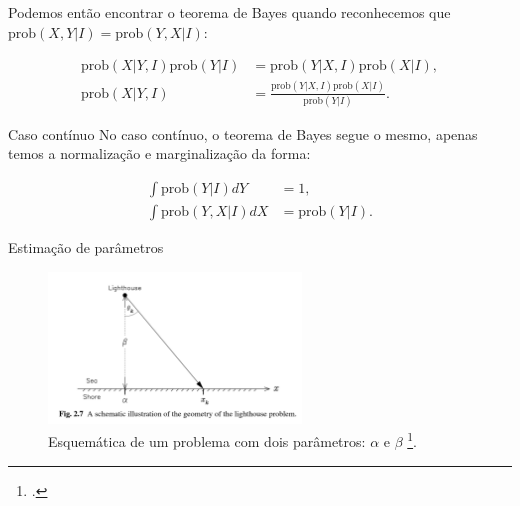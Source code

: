 \documentclass[aspectratio=169,xcolor=dvipsnames]{beamer}
\newcommand{\prob}{\text{prob}}
\begin{document}
\begin{frame}
  Podemos então encontrar o teorema de Bayes quando reconhecemos que $\prob(X, Y | I) = \prob(Y, X | I)$:
  
  \begin{equation}
  \begin{aligned}
    \prob(X | Y, I) \prob(Y | I) &= \prob(Y | X, I) \prob(X | I), \\
    \prob(X | Y, I) &= \frac{\prob(Y | X, I) \prob(X | I)}{\prob(Y | I)}.
  \end{aligned}
  \end{equation}
\end{frame}

\begin{frame}{Caso contínuo}
  No caso contínuo, o teorema de Bayes segue o mesmo, apenas temos a normalização e marginalização da forma:
  
  \begin{equation}
  \begin{aligned}
    \int \prob(Y | I) dY &= 1, \\
    \int \prob(Y,X | I) dX &= \prob(Y | I).
  \end{aligned}
  \end{equation}
\end{frame}

\begin{frame}{Estimação de parâmetros}
  \begin{figure}
    \centering
    \includegraphics[width=0.6\textwidth]{farol.png}
    \caption{Esquemática de um problema com dois parâmetros: $\alpha$ e $\beta$ \footcite{Sivia_2006}.}
  \end{figure}
\end{frame}
\end{document}
